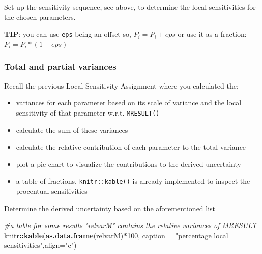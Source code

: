 \documentclass[
]{article}
\newenvironment{Shaded}{\begin{snugshade}}{\end{snugshade}}
\newcommand{\AttributeTok}[1]{\textcolor[rgb]{0.13,0.29,0.53}{#1}}
\newcommand{\CommentTok}[1]{\textcolor[rgb]{0.56,0.35,0.01}{\textit{#1}}}
\newcommand{\DecValTok}[1]{\textcolor[rgb]{0.00,0.00,0.81}{#1}}
\newcommand{\FunctionTok}[1]{\textcolor[rgb]{0.13,0.29,0.53}{\textbf{#1}}}
\newcommand{\NormalTok}[1]{#1}
\newcommand{\SpecialCharTok}[1]{\textcolor[rgb]{0.81,0.36,0.00}{\textbf{#1}}}
\newcommand{\StringTok}[1]{\textcolor[rgb]{0.31,0.60,0.02}{#1}}
\providecommand{\tightlist}{%
  \setlength{\itemsep}{0pt}\setlength{\parskip}{0pt}}
\begin{document}
Set up the sensitivity sequence, see above, to determine the local
sensitivities for the chosen parameters.

\textbf{TIP}: you can use \texttt{eps} being an offset so,
\(P_i = P_i + eps\) or use it as a fraction: \(P_i = P_i*(1 + eps)\)

\hypertarget{total-and-partial-variances}{%
\subsubsection{Total and partial
variances}\label{total-and-partial-variances}}

Recall the previous Local Sensitivity Assignment where you calculated
the:

\begin{itemize}
\tightlist
\item
  variances for each parameter based on its scale of variance and the
  local sensitivity of that parameter w.r.t. \texttt{MRESULT()}
\item
  calculate the sum of these variances
\item
  calculate the relative contribution of each parameter to the total
  variance
\item
  plot a pie chart to visualize the contributions to the derived
  uncertainty
\item
  a table of fractions, \texttt{knitr::kable()} is already implemented
  to inspect the procentual sensitivities
\end{itemize}

Determine the derived uncertainty based on the aforementioned list

\begin{Shaded}
\begin{Highlighting}[]
\CommentTok{\#a table for some results "relvarM" contains the relative variances of MRESULT}
\NormalTok{knitr}\SpecialCharTok{::}\FunctionTok{kable}\NormalTok{(}\FunctionTok{as.data.frame}\NormalTok{(relvarM)}\SpecialCharTok{*}\DecValTok{100}\NormalTok{, }\AttributeTok{caption =} \StringTok{"percentage local sensitivities"}\NormalTok{,}\AttributeTok{align=}\StringTok{"c"}\NormalTok{)}
\end{Highlighting}
\end{Shaded}
\end{document}

